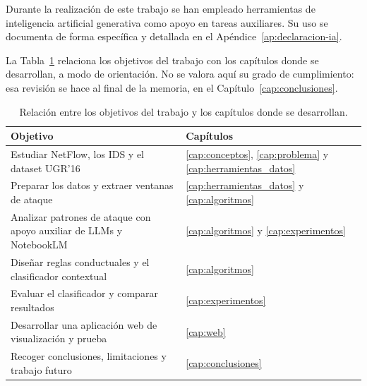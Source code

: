 Durante la realización de este trabajo se han empleado herramientas de inteligencia artificial generativa como apoyo en tareas auxiliares. Su uso se documenta de forma específica y detallada en el Apéndice~\ref{ap:declaracion-ia}.

La Tabla~\ref{tab:objetivos_capitulos} relaciona los objetivos del trabajo con los capítulos donde se desarrollan, a modo de orientación. No se valora aquí su grado de cumplimiento: esa revisión se hace al final de la memoria, en el Capítulo~\ref{cap:conclusiones}.

\begin{table}[ht]
\centering
\small
\begin{tabular}{|p{8.8cm}|l|}
\hline
\textbf{Objetivo} & \textbf{Capítulos} \\
\hline
Estudiar NetFlow, los IDS y el dataset UGR'16 & \ref{cap:conceptos}, \ref{cap:problema} y \ref{cap:herramientas_datos} \\
\hline
Preparar los datos y extraer ventanas de ataque & \ref{cap:herramientas_datos} y \ref{cap:algoritmos} \\
\hline
Analizar patrones de ataque con apoyo auxiliar de LLMs y NotebookLM & \ref{cap:algoritmos} y \ref{cap:experimentos} \\
\hline
Diseñar reglas conductuales y el clasificador contextual & \ref{cap:algoritmos} \\
\hline
Evaluar el clasificador y comparar resultados & \ref{cap:experimentos} \\
\hline
Desarrollar una aplicación web de visualización y prueba & \ref{cap:web} \\
\hline
Recoger conclusiones, limitaciones y trabajo futuro & \ref{cap:conclusiones} \\
\hline
\end{tabular}
\caption{Relación entre los objetivos del trabajo y los capítulos donde se desarrollan.}
\label{tab:objetivos_capitulos}
\end{table}
